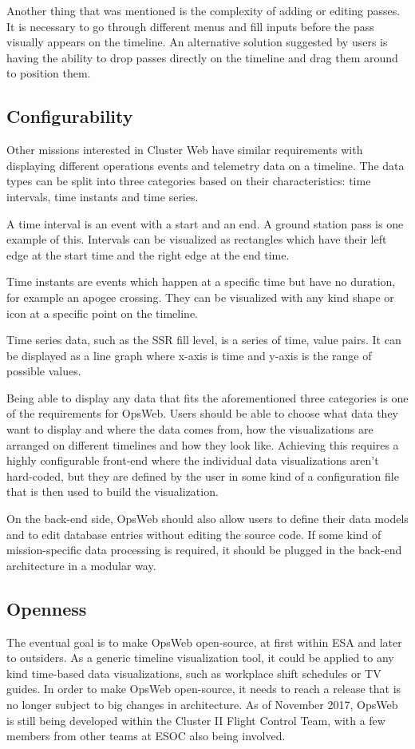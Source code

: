 Another thing that was mentioned is the complexity of adding or editing passes. It is necessary to go through different menus and fill inputs before the pass visually appears on the timeline. An alternative solution suggested by users is having the ability to drop passes directly on the timeline and drag them around to position them.

\subsection{Configurability} \label{configurability_req}
Other missions interested in Cluster Web have similar requirements with displaying different operations events and telemetry data on a timeline. The data types can be split into three categories based on their characteristics: time intervals, time instants and time series.

A time interval is an event with a start and an end. A ground station pass is one example of this. Intervals can be visualized as rectangles which have their left edge at the start time and the right edge at the end time.

Time instants are events which happen at a specific time but have no duration, for example an apogee crossing. They can be visualized with any kind shape or icon at a specific point on the timeline.

Time series data, such as the SSR fill level, is a series of time, value pairs. It can be displayed as a line graph where x-axis is time and y-axis is the range of possible values.

Being able to display any data that fits the aforementioned three categories is one of the requirements for OpsWeb. Users should be able to choose what data they want to display and where the data comes from, how the visualizations are arranged on different timelines and how they look like. Achieving this requires a highly configurable front-end where the individual data visualizations aren't hard-coded, but they are defined by the user in some kind of a configuration file that is then used to build the visualization.

On the back-end side, OpsWeb should also allow users to define their data models and to edit database entries without editing the source code. If some kind of mission-specific data processing is required, it should be plugged in the back-end architecture in a modular way.

\subsection{Openness}
The eventual goal is to make OpsWeb open-source, at first within ESA and later to outsiders. As a generic timeline visualization tool, it could be applied to any kind time-based data visualizations, such as workplace shift schedules or TV guides. In order to make OpsWeb open-source, it needs to reach a release that is no longer subject to big changes in architecture. As of November 2017, OpsWeb is still being developed within the Cluster II Flight Control Team, with a few members from other teams at ESOC also being involved. 

